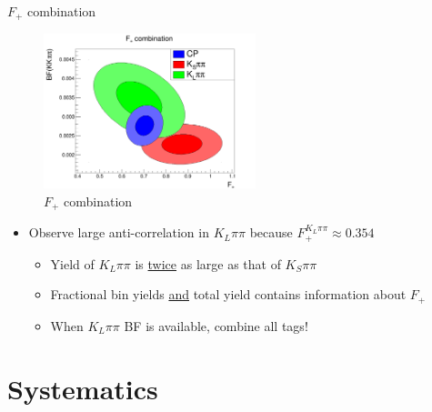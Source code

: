 \documentclass{beamer}
\begin{document}
\begin{frame}{$F_+$ combination}
  \begin{figure}
    \includegraphics[width = 0.55\textwidth]{Plots/FPlus_contours.png}
    \caption{$F_+$ combination}
  \end{figure}
  \vspace{-0.6cm}
  \begin{itemize}
    \item{Observe large anti-correlation in $K_L\pi\pi$ because $F^{K_L\pi\pi}_+\approx 0.354$}
    \begin{itemize}
      \item{Yield of $K_L\pi\pi$ is \underline{twice} as large as that of $K_S\pi\pi$}
      \item{Fractional bin yields \underline{and} total yield contains information about $F_+$}
      \item{When $K_L\pi\pi$ BF is available, combine all tags!}
    \end{itemize}
  \end{itemize}
\end{frame}

\section{Systematics}
\end{document}
